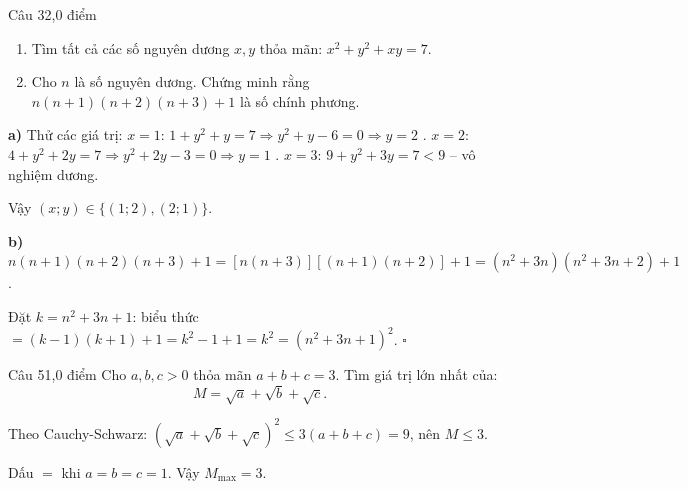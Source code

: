 \begin{de_cau}{Câu 3}{2,0 điểm}
\begin{enumerate}[label=\alph*)]
  \item Tìm tất cả các số nguyên dương $x, y$ thỏa mãn: $x^2 + y^2 + xy = 7$.
  \item Cho $n$ là số nguyên dương. Chứng minh rằng $n(n+1)(n+2)(n+3)+1$ là số chính phương.
\end{enumerate}
\end{de_cau}

\begin{loi_giai_cau}
\textbf{a)} Thử các giá trị: $x=1$: $1+y^2+y=7\Rightarrow y^2+y-6=0\Rightarrow y=2$ \checkmark . $x=2$: $4+y^2+2y=7\Rightarrow y^2+2y-3=0\Rightarrow y=1$ \checkmark . $x=3$: $9+y^2+3y=7<9$ -- vô nghiệm dương.

Vậy $(x;y)\in\{(1;2),(2;1)\}$.

\textbf{b)} $n(n+1)(n+2)(n+3)+1=[n(n+3)][(n+1)(n+2)]+1=(n^2+3n)(n^2+3n+2)+1$.

Đặt $k=n^2+3n+1$: biểu thức $=(k-1)(k+1)+1=k^2-1+1=k^2=(n^2+3n+1)^2$. $\square$
\end{loi_giai_cau}

\begin{de_cau}{Câu 5}{1,0 điểm}
Cho $a, b, c > 0$ thỏa mãn $a + b + c = 3$. Tìm giá trị lớn nhất của:
\[M = \sqrt{a} + \sqrt{b} + \sqrt{c}.\]
\end{de_cau}

\begin{loi_giai_cau}
Theo Cauchy-Schwarz: $(\sqrt{a}+\sqrt{b}+\sqrt{c})^2\le3(a+b+c)=9$, nên $M\le3$.

Dấu $=$ khi $a=b=c=1$. Vậy $M_{\max}=\boxed{3}$.
\end{loi_giai_cau}
